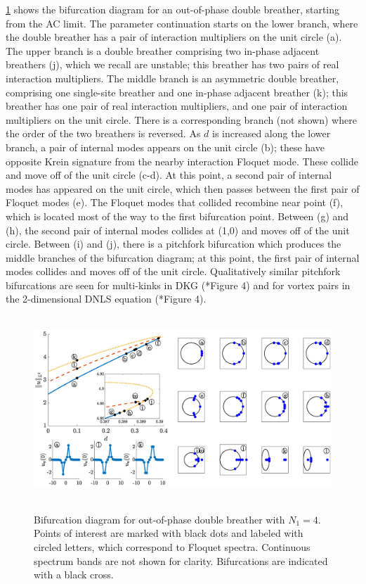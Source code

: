 \documentclass[12pt,reqno]{amsart}
\theoremstyle{definition}
\begin{document}
\cref{fig:bifdiagSGoop1} shows the bifurcation diagram for an out-of-phase double breather, starting from the AC limit. The parameter continuation starts on the lower branch, where the double breather has a pair of interaction multipliers on the unit circle (a). The upper branch is a double breather comprising two in-phase adjacent breathers (j), which we recall are unstable; this breather has two pairs of real interaction multipliers. The middle branch is an asymmetric double breather, comprising one single-site breather and one in-phase adjacent breather (k); this breather has one pair of real interaction multipliers, and one pair of interaction multipliers on the unit circle. There is a corresponding branch (not shown) where the order of the two breathers is reversed. As $d$ is increased along the lower branch, a pair of internal modes appears on the unit circle (b); these have opposite Krein signature from the nearby interaction Floquet mode. These collide and move off of the unit circle (c-d). At this point, a second pair of internal modes has appeared on the unit circle, which then passes between the first pair of Floquet modes (e). The Floquet modes that collided recombine near point (f), which is located most of the way to the first bifurcation point. Between (g) and (h), the second pair of internal modes collides at (1,0) and moves off of the unit circle. Between (i) and (j), there is a pitchfork bifurcation which produces the middle branches of the bifurcation diagram; at this point, the first pair of internal modes collides and moves off of the unit circle. Qualitatively similar pitchfork bifurcations are seen for multi-kinks in DKG (\cite{Parker2021}*{Figure 4}) and for vortex pairs in the 2-dimensional DNLS equation (\cite{Bramburger2020}*{Figure 4}).

\begin{figure}
	\hbox{
	\hspace{-2cm}
	\includegraphics[width=20cm]{bifdiagSGoppositeN4.eps} 
	}
	\caption{Bifurcation diagram for out-of-phase double breather with $N_1 = 4$. Points of interest are marked with black dots and labeled with circled letters, which correspond to Floquet spectra. Continuous spectrum bands are not shown for clarity. Bifurcations are indicated with a black cross.}
	\label{fig:bifdiagSGoop1}
\end{figure}
\end{document}
